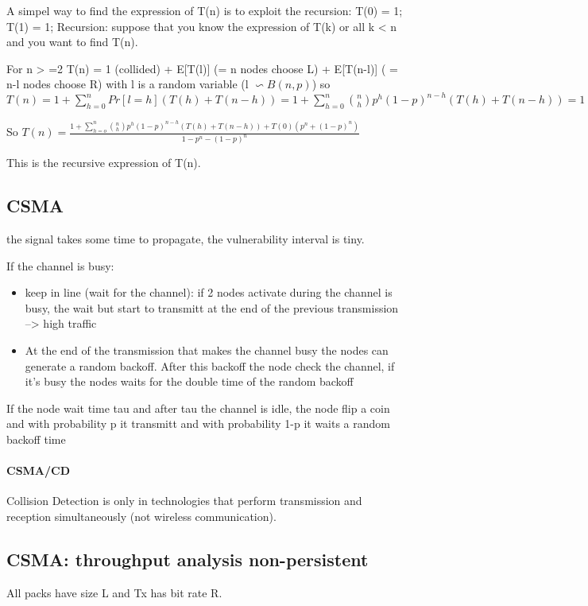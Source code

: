 A simpel way to find the expression of T(n) is to exploit the recursion:
T(0) = 1; 
T(1) = 1;
Recursion: suppose that you know the expression of T(k) or all k < n and you want to find T(n). 

For n > =2 T(n) = 1 (collided) + E[T(l)] (= n nodes choose L) + E[T(n-l)] ( = n-l nodes choose R)  with l is a random variable (l $\backsim B(n,p)$)
so $T(n) = 1 + \sum\limits_{h = 0}^{n} Pr[l=h](T(h)+T(n-h)) = 1 + \sum\limits_{h=0}^{n} \binom{n}{h} p^h(1-p)^{n-h} (T(h)+T(n-h)) = 1 + \sum\limits_{h=1}^{n-1} \binom{n}{h}p^h(1-p)^{n-h}(T(h)+T(n-h)) + (T(0)+ T(n))(p^n - (1-p)^n) $

So $T(n) = \frac{1 + \sum\limits_{h=o}^{n} \binom{n}{h} p^h(1-p)^{n-h}(T(h)+T(n-h)) + T(0)(p^n+(1-p)^n)}{1-p^n-(1-p)^n}$ 

This is the recursive expression of T(n).



\subsection{CSMA}

the signal takes some time to propagate, the vulnerability interval is tiny.

If the channel is busy:
\begin{itemize}
\item keep in line (wait for the channel): if 2 nodes activate during the channel is busy, the wait but start to transmitt at the end of the previous transmission --> high traffic
\item At the end of the transmission that makes the channel busy the nodes can generate a random backoff. After this backoff the node check the channel, if it's busy the nodes waits for the double time of the random backoff
\end{itemize}

If the node wait time tau and after tau the channel is idle, the node flip a coin and with probability p it transmitt and with probability 1-p it waits a random backoff time
\paragraph{CSMA/CD}
Collision Detection is only in technologies that perform transmission and reception simultaneously (not wireless communication).  


\subsection{CSMA: throughput analysis non-persistent}
All packs have size L and Tx has bit rate R.


